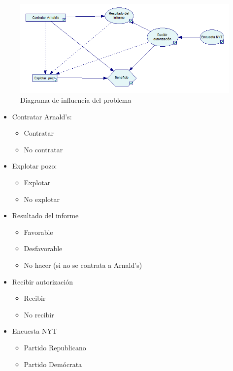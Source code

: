 \documentclass[12pt,a4paper,openright,final]{article}
\begin{document}
\begin{figure}[tbph!]
	\centering
	\includegraphics[width=\linewidth]{imagenes/diagrama_influencia.png}
	\caption{Diagrama de influencia del problema}
	\label{fig:diagrama_influencia}
\end{figure}

\begin{itemize}
	\item Contratar Arnald's:
	
	\begin{itemize}
		\item Contratar
		\item No contratar
	\end{itemize}
	
	\item Explotar pozo:
	
	\begin{itemize}
		\item Explotar
		\item No explotar
	\end{itemize}
	
	\item Resultado del informe
	
	\begin{itemize}
		\item Favorable
		\item Desfavorable
		\item No hacer (si no se contrata a Arnald's)
	\end{itemize} 
	
	\item Recibir autorización
	
	\begin{itemize}
		\item Recibir
		\item No recibir
	\end{itemize}
	
	\item Encuesta NYT
	
	\begin{itemize}
		\item Partido Republicano
		\item Partido Demócrata
	\end{itemize}
	
\end{itemize}
\end{document}
